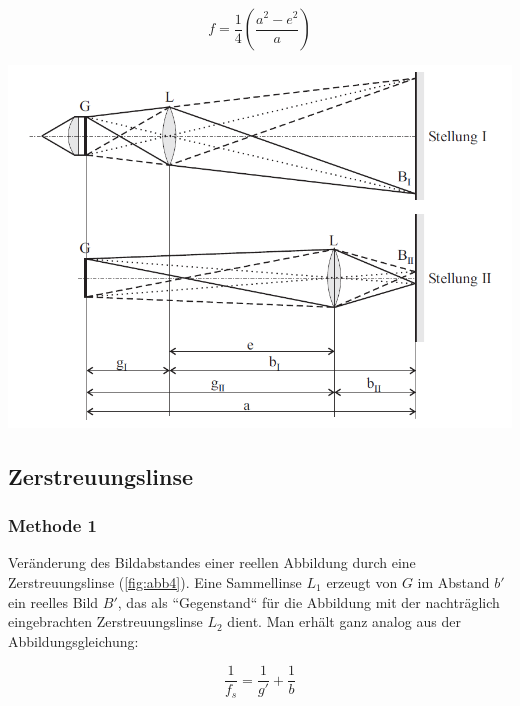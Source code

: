 \documentclass[11pt,ngerman]{scrartcl}
\begin{document}
\begin{equation}
	f = \frac{1}{4} \left(\frac{a^2-e^2}{a}\right)
\end{equation}

\begin{center}
	\begin{minipage}[t]{\textwidth}
		\centering
		\includegraphics[width=\textwidth]{abb3}
		\label{fig:abb3}
	\end{minipage}
\end{center}

\vspace{5mm}

\subsection{Zerstreuungslinse}

\subsubsection{Methode 1}

Veränderung des Bildabstandes einer reellen Abbildung durch eine Zerstreuungslinse (\autoref{fig:abb4}).
Eine Sammellinse $L_1$ erzeugt von $G$ im Abstand $b'$ ein reelles Bild $B'$, das als
``Gegenstand``  für die Abbildung mit der nachträglich eingebrachten Zerstreuungslinse $L_2$ dient. Man erhält ganz
analog aus der Abbildungsgleichung:

\begin{equation}
	\frac{1}{f_s} = \frac{1}{g'} + \frac{1}{b}
\end{equation}
\end{document}
